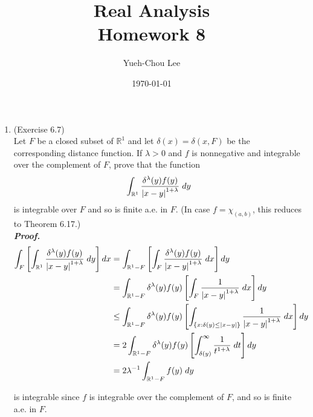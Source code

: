 \documentclass[a4paper,11pt]{article}
\title{Real Analysis \\ Homework 8}
\author{Yueh-Chou Lee}
\date{\today}
\begin{document}
\maketitle
 \begin{enumerate}
 	\item (Exercise 6.7)\\
 		Let $F$ be a closed subset of $\mathbb{R}^1$ and let $\delta(x) = \delta(x,F)$ be the corresponding distance function. If $\lambda > 0$ and $f$ is nonnegative and integrable over the complement of $F$, prove that the function
 		$$\int_{\mathbb{R}^1} \frac{\delta^{\lambda} (y) f(y)}{\left| x - y \right|^{1+\lambda}} \hspace{0.1cm} dy$$
 		is integrable over $F$ and so is finite a.e. in $F$. (In case $f = \chi_{(a,b)}$, this reduces to Theorem 6.17.)\\

 		\textit{\textbf {Proof.}}\\

 		$$\begin{aligned}
 		\int_F \left[ \int_{\mathbb{R}^1} \frac{\delta^{\lambda} (y) f(y)}{\left| x - y \right|^{1+\lambda}} \hspace{0.1cm} dy \right] dx
 		&= \int_{\mathbb{R}^1 - F} \left[ \int_F \frac{\delta^{\lambda} (y) f(y)}{\left| x - y \right|^{1+\lambda}} \hspace{0.1cm} dx \right] dy\\
 		&= \int_{\mathbb{R}^1 - F} \delta^{\lambda} (y) f(y) \left[ \int_F \frac{1}{\left| x - y \right|^{1+\lambda}} \hspace{0.1cm} dx \right] dy\\
 		&\leq \int_{\mathbb{R}^1 - F} \delta^{\lambda} (y) f(y) \left[ \int_{\{x:\delta(y) \leq |x-y|\}} \frac{1}{\left| x - y \right|^{1+\lambda}} \hspace{0.1cm} dx \right] dy\\
 		&= 2 \int_{\mathbb{R}^1 - F} \delta^{\lambda} (y) f(y) \left[ \int_{\delta(y)}^\infty \frac{1}{t^{1+\lambda}} \hspace{0.1cm} dt \right] dy\\
 		&= 2 \lambda^{-1} \int_{\mathbb{R}^1 - F} f(y) \hspace{0.1cm} dy
 		\end{aligned}$$

 		is integrable since $f$ is integrable over the complement of $F$, and so is finite a.e. in $F$.\\





\end{enumerate}
\end{document}
